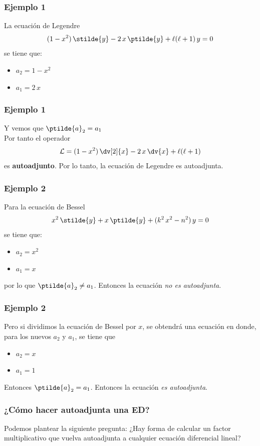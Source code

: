 \begin{frame}
\frametitle{Ejemplo 1}
La ecuación de Legendre
\begin{align*}
(1 - x^{2}) \, \stilde{y} - 2 \, x \, \ptilde{y} + \ell (\ell +  1) \, y = 0
\end{align*}
se tiene que:
\begin{itemize}[<+->]
\item $a_{2} = 1 -x^{2}$
\item $a_{1} = 2 \, x$
\end{itemize}
\end{frame}
\begin{frame}
\frametitle{Ejemplo 1}
Y vemos que $\ptilde{a}_{2} = a_{1}$
\\
\bigskip
\pause
Por tanto el operador
\begin{align*}
\mathcal{L} = (1 - x^{2}) \, \dv[2]{x} - 2 \, x \, \dv{x} + \ell(\ell + 1)
\end{align*}
es \textbf{autoadjunto}. \pause Por lo tanto, la ecuación de Legendre es autoadjunta.
\end{frame}
\begin{frame}
\frametitle{Ejemplo 2}
Para la ecuación de Bessel
\begin{align*}
x^{2} \, \stilde{y} + x \, \ptilde{y} + (k^{2} \, x^{2} - n^{2}) \, y = 0
\end{align*}
\pause
se tiene que:
\begin{itemize} [<+->]
\item $a_{2} = x^{2}$
\item $a_{1} = x$
\end{itemize}
\pause
por lo que $\ptilde{a}_{2} \neq a_{1}$. \pause Entonces la ecuación \emph{no es autoadjunta}.
\end{frame}
\begin{frame}
\frametitle{Ejemplo 2}
Pero si dividimos la ecuación de Bessel por $x$, se obtendrá una ecuación en donde, para los nuevos $a_{2}$ y $a_{1}$, \pause se tiene que
\begin{itemize} [<+->]
\item $a_{2} = x$
\item $a_{1} = 1$
\end{itemize}
\pause
Entonces $\ptilde{a}_{2} = a_{1}$. \pause Entonces la ecuación \emph{es autoadjunta}.
\end{frame}
\begin{frame}
\frametitle{¿Cómo hacer autoadjunta una ED?}
Podemos plantear la siguiente pregunta: ¿Hay forma de calcular un factor multiplicativo que vuelva autoadjunta a cualquier ecuación diferencial lineal?
\end{frame}
